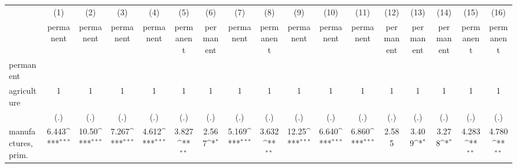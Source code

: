 {
\def\sym#1{\ifmmode^{#1}\else\(^{#1}\)\fi}
\begin{tabular}{l*{16}{c}}
\hline\hline
                    &\multicolumn{1}{c}{(1)}&\multicolumn{1}{c}{(2)}&\multicolumn{1}{c}{(3)}&\multicolumn{1}{c}{(4)}&\multicolumn{1}{c}{(5)}&\multicolumn{1}{c}{(6)}&\multicolumn{1}{c}{(7)}&\multicolumn{1}{c}{(8)}&\multicolumn{1}{c}{(9)}&\multicolumn{1}{c}{(10)}&\multicolumn{1}{c}{(11)}&\multicolumn{1}{c}{(12)}&\multicolumn{1}{c}{(13)}&\multicolumn{1}{c}{(14)}&\multicolumn{1}{c}{(15)}&\multicolumn{1}{c}{(16)}\\
                    &\multicolumn{1}{c}{permanent}&\multicolumn{1}{c}{permanent}&\multicolumn{1}{c}{permanent}&\multicolumn{1}{c}{permanent}&\multicolumn{1}{c}{permanent}&\multicolumn{1}{c}{permanent}&\multicolumn{1}{c}{permanent}&\multicolumn{1}{c}{permanent}&\multicolumn{1}{c}{permanent}&\multicolumn{1}{c}{permanent}&\multicolumn{1}{c}{permanent}&\multicolumn{1}{c}{permanent}&\multicolumn{1}{c}{permanent}&\multicolumn{1}{c}{permanent}&\multicolumn{1}{c}{permanent}&\multicolumn{1}{c}{permanent}\\
\hline
permanent           &                     &                     &                     &                     &                     &                     &                     &                     &                     &                     &                     &                     &                     &                     &                     &                     \\
agriculture         &           1         &           1         &           1         &           1         &           1         &           1         &           1         &           1         &           1         &           1         &           1         &           1         &           1         &           1         &           1         &           1         \\
                    &         (.)         &         (.)         &         (.)         &         (.)         &         (.)         &         (.)         &         (.)         &         (.)         &         (.)         &         (.)         &         (.)         &         (.)         &         (.)         &         (.)         &         (.)         &         (.)         \\
[1em]
manufactures, prim. &       6.443\sym{***}&       10.50\sym{***}&       7.267\sym{***}&       4.612\sym{***}&       3.827\sym{**} &       2.567\sym{*}  &       5.169\sym{***}&       3.632\sym{**} &       12.25\sym{***}&       6.640\sym{***}&       6.860\sym{***}&       2.585         &       3.409\sym{*}  &       3.278\sym{*}  &       4.283\sym{**} &       4.780\sym{**} \\

\end{tabular}}
